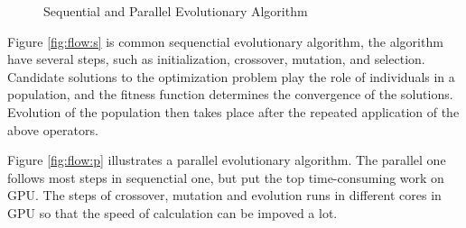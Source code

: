 \begin{figure}[!ht]
\begin{minipage}{0.29\textwidth}
{    }
  \end{minipage}
  \begin{minipage}{0.58\textwidth}
    \centering
  \end{minipage}
  \caption{Sequential and Parallel Evolutionary Algorithm}
  \label{fig:flow}
\end{figure}


Figure \ref{fig:flow:s} is common sequenctial evolutionary algorithm, the
algorithm have several steps, such as initialization, crossover, mutation, and
selection. Candidate solutions to the optimization problem play the role of
individuals in a population, and the fitness function determines the convergence
of the solutions. Evolution of the population then takes place after the
repeated application of the above operators.


Figure \ref{fig:flow:p} illustrates a parallel evolutionary algorithm. The
parallel one follows most steps in sequenctial one, but put the top
time-consuming work on GPU. The steps of crossover, mutation and evolution runs
in different cores in GPU so that the speed of calculation can be impoved a lot.




